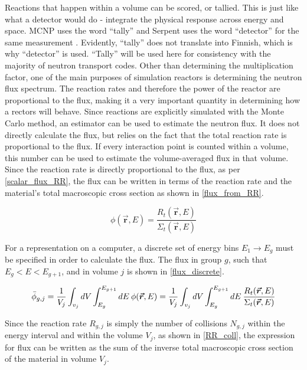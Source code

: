 Reactions that happen within a volume can be scored, or tallied.  This is just like what a detector would do - integrate the physical response across energy and space.  MCNP uses the word ``tally'' and Serpent uses the word ``detector'' for the same measurement \cite{serpent,mcnp}.  Evidently, ``tally'' does not translate into Finnish, which is why ``detector'' is used.  ``Tally'' will be used here for consistency with the majority of neutron transport codes.  Other than determining the multiplication factor, one of the main purposes of simulation reactors is determining the neutron flux spectrum.  The reaction rates and therefore the power of the reactor are proportional to the flux, making it a very important quantity in determining how a rectors will behave.  Since reactions are explicitly simulated with the  Monte Carlo method, an estimator can be used to estimate the neutron flux.  It does not directly calculate the flux, but relies on the fact that the total reaction rate is proportional to the flux.  If every interaction point is counted within a volume, this number can be used to estimate the volume-averaged flux in that volume.  Since the reaction rate is directly proportional to the flux, as per \eqref{scalar_flux_RR}, the flux can be written in terms of the reaction rate and the material's total macroscopic cross section as shown in \eqref{flux_from_RR}.

\begin{equation}
\label{flux_from_RR}
\phi(\boldsymbol{\vec{r}},E) = \frac{ R_t(\boldsymbol{\vec{r}},E) }{  \Sigma_t(\boldsymbol{\vec{r}},E) }
\end{equation}

For a representation on a computer, a discrete set of energy bins $E_1 \rightarrow E_g$ must be specified in order to calculate the flux.  The flux in group $g$, such that $E_g < E < E_{g+1}$, and in volume $j$ is shown in \eqref{flux_discrete}.

\begin{equation}
\label{flux_discrete}
\bar{\phi}_{g,j} = \frac{1}{V_j} \int_{v_j} dV \int_{E_g}^{E_{g+1}} dE \: \phi(\boldsymbol{\vec{r}},E) = \frac{1}{V_j} \int_{v_j} dV \int_{E_g}^{E_{g+1}} dE \:\frac{ R_t(\boldsymbol{\vec{r}},E) }{  \Sigma_t(\boldsymbol{\vec{r}},E) } \\
\end{equation}

Since the reaction rate $R_{g,j}$ is simply the number of collisions $N_{g,j}$ within the energy interval and within the volume $V_j$, as shown in \eqref{RR_coll}, the expression for flux can be written as the sum of the inverse total macroscopic cross section of the material in volume $V_j$.

